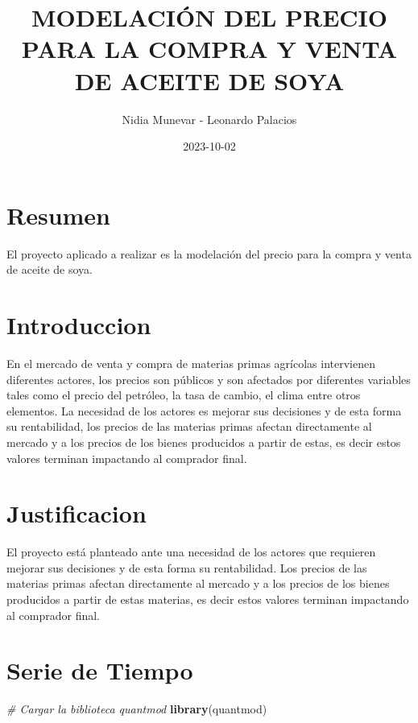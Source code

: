 \documentclass[
]{book}
\title{MODELACIÓN DEL PRECIO PARA LA COMPRA Y VENTA DE ACEITE DE SOYA}
\author{Nidia Munevar - Leonardo Palacios}
\date{2023-10-02}
\newenvironment{Shaded}{\begin{snugshade}}{\end{snugshade}}
\newcommand{\CommentTok}[1]{\textcolor[rgb]{0.56,0.35,0.01}{\textit{#1}}}
\newcommand{\FunctionTok}[1]{\textcolor[rgb]{0.13,0.29,0.53}{\textbf{#1}}}
\newcommand{\NormalTok}[1]{#1}
\begin{document}
\maketitle

{
\setcounter{tocdepth}{1}
\tableofcontents
}
\hypertarget{resumen}{%
\chapter{Resumen}\label{resumen}}

El proyecto aplicado a realizar es la modelación del precio para la compra y venta de aceite de soya.

\hypertarget{introduccion}{%
\chapter{Introduccion}\label{introduccion}}

En el mercado de venta y compra de materias primas agrícolas intervienen diferentes actores, los precios son públicos y son afectados por diferentes variables tales como el precio del petróleo, la tasa de cambio, el clima entre otros elementos. La necesidad de los actores es mejorar sus decisiones y de esta forma su rentabilidad, los precios de las materias primas afectan directamente al mercado y a los precios de los bienes producidos a partir de estas, es decir estos valores terminan impactando al comprador final.

\hypertarget{justificacion}{%
\chapter{Justificacion}\label{justificacion}}

El proyecto está planteado ante una necesidad de los actores que requieren mejorar sus decisiones y de esta forma su rentabilidad. Los precios de las materias primas afectan directamente al mercado y a los precios de los bienes producidos a partir de estas materias, es decir estos valores terminan impactando al comprador final.

\hypertarget{serie-de-tiempo}{%
\chapter{Serie de Tiempo}\label{serie-de-tiempo}}

\begin{Shaded}
\begin{Highlighting}[]
\CommentTok{\# Cargar la biblioteca quantmod}
\FunctionTok{library}\NormalTok{(quantmod)}
\end{Highlighting}
\end{Shaded}
\end{document}
